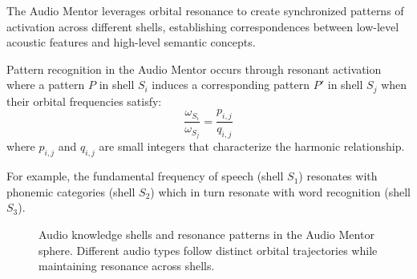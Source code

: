 The Audio Mentor leverages orbital resonance to create synchronized patterns of activation across different shells, establishing correspondences between low-level acoustic features and high-level semantic concepts.

\begin{theorem}
Pattern recognition in the Audio Mentor occurs through resonant activation where a pattern $P$ in shell $S_i$ induces a corresponding pattern $P'$ in shell $S_j$ when their orbital frequencies satisfy:
\begin{equation}
\frac{\omega_{S_i}}{\omega_{S_j}} = \frac{p_{i,j}}{q_{i,j}}
\end{equation}
where $p_{i,j}$ and $q_{i,j}$ are small integers that characterize the harmonic relationship.
\end{theorem}

For example, the fundamental frequency of speech (shell $S_1$) resonates with phonemic categories (shell $S_2$) which in turn resonate with word recognition (shell $S_3$).

\begin{figure}[h]
\centering
{}
\caption{Audio knowledge shells and resonance patterns in the Audio Mentor sphere. Different audio types follow distinct orbital trajectories while maintaining resonance across shells.}
\label{fig:audio_shells}
\end{figure}

